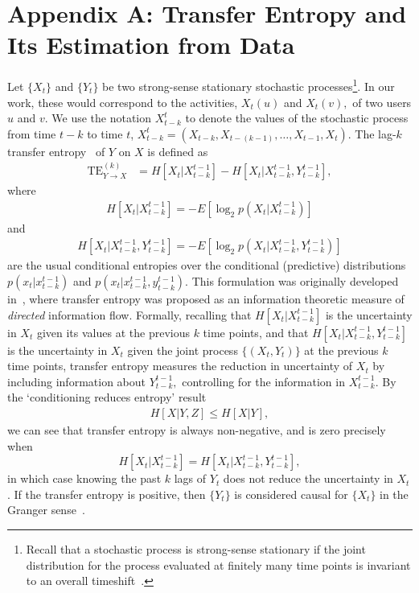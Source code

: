 \appendix

\section{Appendix A: Transfer Entropy and Its Estimation from Data}

Let $\{X_{t}\}$ and $\{ Y_{t}\}$ be two strong-sense stationary stochastic processes\footnote{Recall that a stochastic process is strong-sense stationary if the joint distribution for the process evaluated at finitely many time points is invariant to an overall timeshift~\cite{grimmett2001probability}.}. In our work, these would correspond to the activities, $X_{t}(u)$ and $X_{t}(v),$ of two users $u$ and $v$. We use the notation $X_{t-k}^{t}$ to denote the values of the stochastic process from time $t-k$ to time $t$, $X_{t-k}^{t} = (X_{t-k}, X_{t-(k-1)}, \ldots, X_{t - 1}, X_{t})$. The lag-$k$ transfer entropy~\cite{schreiber2000measuring} of $Y$ on $X$ is defined as 
\begin{align}
	\text{TE}_{Y \to X}^{(k)} &= H\left[X_{t} | X_{t-k}^{t-1}\right] - H\left[X_{t} | X_{t-k}^{t-1}, Y_{t-k}^{t-1}\right], \label{Eqn-TE}
\end{align}
where
\begin{align}
	H\left[X_{t} | X_{t-k}^{t-1}\right] = - E\left[ \log_{2} p(X_{t} | X_{t-k}^{t-1}) \right]
\end{align}
and 
\begin{align}
	H\left[X_{t} | X_{t-k}^{t-1}, Y_{t-k}^{t-1}\right] = - E\left[ \log_{2} p(X_{t} | X_{t-k}^{t-1}, Y_{t-k}^{t-1}) \right]
\end{align}
are the usual conditional entropies over the conditional (predictive) distributions $p(x_{t} | x_{t-k}^{t-1})$ and $p(x_{t} | x_{t-k}^{t-1}, y_{t-k}^{t-1})$. This formulation was originally developed in~\cite{schreiber2000measuring}, where transfer entropy was proposed as an information theoretic measure of \emph{directed} information flow. Formally, recalling that $H\left[X_{t} | X_{t-k}^{t-1}\right]$ is the uncertainty in $X_{t}$ given its values at the previous $k$ time points, and that $H\left[X_{t} | X_{t-k}^{t-1}, Y_{t-k}^{t-1}\right]$ is the uncertainty in $X_{t}$ given the joint process $\{(X_{t}, Y_{t})\}$ at the previous $k$ time points, transfer entropy measures the reduction in uncertainty of $X_{t}$ by including information about $Y_{t-k}^{t-1},$ controlling for the information in $X_{t - k}^{t-1}$. By the `conditioning reduces entropy' result~\cite{cover2012elements}
\begin{align}
	H[X | Y, Z] \leq H[X | Y],
\end{align}
we can see that transfer entropy is always non-negative, and is zero precisely when $$H\left[X_{t} | X_{t-k}^{t-1}\right] = H\left[X_{t} | X_{t-k}^{t-1}, Y_{t-k}^{t-1}\right],$$ in which case knowing the past $k$ lags of $Y_{t}$ does not reduce the uncertainty in $X_{t}$. If the transfer entropy is positive, then $\{ Y_{t}\}$ is considered causal for $\{ X_{t}\}$ in the Granger sense~\cite{granger1963economic}.

